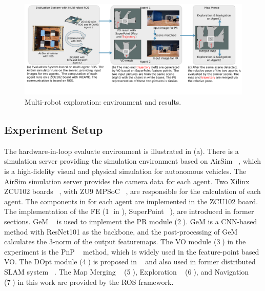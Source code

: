 \label{sec:experiments}


\begin{figure}[t]
  \centering
  \setlength{\abovecaptionskip}{0cm} 
  \includegraphics[width=0.99\linewidth]{fig/env.pdf}
  \caption{Multi-robot exploration: environment and results. }
  \label{fig:env}
\end{figure}





\subsection{ Experiment Setup }

The hardware-in-loop evaluate environment is illustrated in (a). There is a simulation server providing the simulation environment based on AirSim  ~\cite{shah2018airsim}, which is a high-fidelity visual and physical simulation for autonomous vehicles. The AirSim simulation server provides the camera data for each agent. Two Xilinx ZCU102 boards  ~\cite{zcu102}, with ZU9 MPSoC  ~\cite{MPSoC}, are responsible for the calculation of each agent. 
The components in  for each agent are implemented in the ZCU102 board. The implementation of the FE (\textcircled{1} in ), SuperPoint ~\cite{detone2018superpoint}), are introduced in former sections. GeM  ~\cite{radenovic2018fine} is used to implement the PR module (\textcircled{2}). GeM is a CNN-based method with ResNet101 \cite{he2016deep} as the backbone, and the post-processing of GeM calculates the 3-norm of the output featuremaps.
The VO module (\textcircled{3}) in the experiment is the PnP  ~\cite{LepetitMoreno-Noguer-EPnP} method, which is widely used in the feature-point based VO. 
The DOpt module (\textcircled{4}) is proposed in  ~\cite{Choudhary:2017e66} and also used in former distributed SLAM system ~\cite{cieslewski2018data}. 
The Map Merging  ~\cite{Andre2014} (\textcircled{5}), Exploration  ~\cite{8202319} (\textcircled{6}), and Navigation  ~\cite{tbd} (\textcircled{7}) in this work are provided by the ROS framework. 

